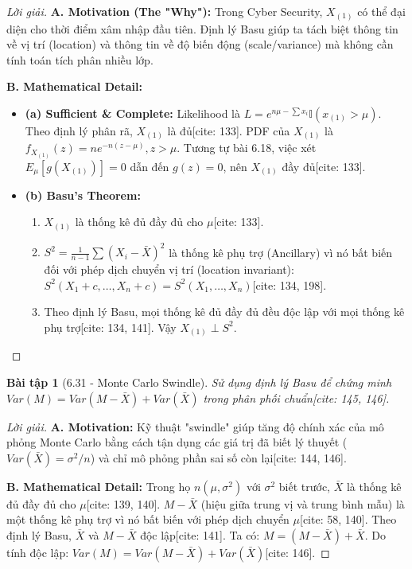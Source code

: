 \documentclass[8pt,a4paper]{article}
\newtheorem{exercise}{Bài tập}
\newenvironment{solution}{\begin{proof}[Lời giải]}{\end{proof}}
\begin{document}
\begin{solution}
\textbf{A. Motivation (The "Why"):} Trong Cyber Security, $X_{(1)}$ có thể đại diện cho thời điểm xâm nhập đầu tiên. Định lý Basu giúp ta tách biệt thông tin về vị trí (location) và thông tin về độ biến động (scale/variance) mà không cần tính toán tích phân nhiều lớp.

\textbf{B. Mathematical Detail:}
\begin{itemize}
    \item \textbf{(a) Sufficient \& Complete:} Likelihood là $L = e^{n\mu - \sum x_i} \mathbb{I}(x_{(1)} > \mu)$. Theo định lý phân rã, $X_{(1)}$ là đủ[cite: 133]. PDF của $X_{(1)}$ là $f_{X_{(1)}}(z) = n e^{-n(z-\mu)}, z > \mu$. Tương tự bài 6.18, việc xét $E_\mu[g(X_{(1)})]=0$ dẫn đến $g(z)=0$, nên $X_{(1)}$ đầy đủ[cite: 133].
    \item \textbf{(b) Basu's Theorem:} 
    \begin{enumerate}
        \item $X_{(1)}$ là thống kê đủ đầy đủ cho $\mu$[cite: 133].
        \item $S^2 = \frac{1}{n-1}\sum (X_i - \bar{X})^2$ là thống kê phụ trợ (Ancillary) vì nó bất biến đối với phép dịch chuyển vị trí (location invariant): $S^2(X_1+c, \dots, X_n+c) = S^2(X_1, \dots, X_n)$[cite: 134, 198]. 
        \item Theo định lý Basu, mọi thống kê đủ đầy đủ đều độc lập với mọi thống kê phụ trợ[cite: 134, 141]. Vậy $X_{(1)} \perp S^2$.
    \end{enumerate}
\end{itemize}
\end{solution}

\begin{exercise}[6.31 - Monte Carlo Swindle]
Sử dụng định lý Basu để chứng minh $Var(M) = Var(M-\bar{X}) + Var(\bar{X})$ trong phân phối chuẩn[cite: 145, 146].
\end{exercise}

\begin{solution}
\textbf{A. Motivation:} Kỹ thuật "swindle" giúp tăng độ chính xác của mô phỏng Monte Carlo bằng cách tận dụng các giá trị đã biết lý thuyết ($Var(\bar{X}) = \sigma^2/n$) và chỉ mô phỏng phần sai số còn lại[cite: 144, 146].

\textbf{B. Mathematical Detail:}
Trong họ $n(\mu, \sigma^2)$ với $\sigma^2$ biết trước, $\bar{X}$ là thống kê đủ đầy đủ cho $\mu$[cite: 139, 140]. 
$M - \bar{X}$ (hiệu giữa trung vị và trung bình mẫu) là một thống kê phụ trợ vì nó bất biến với phép dịch chuyển $\mu$[cite: 58, 140].
Theo định lý Basu, $\bar{X}$ và $M-\bar{X}$ độc lập[cite: 141]. 
Ta có: $M = (M - \bar{X}) + \bar{X}$.
Do tính độc lập: $Var(M) = Var(M - \bar{X}) + Var(\bar{X})$[cite: 146].
\end{solution}
\end{document}
